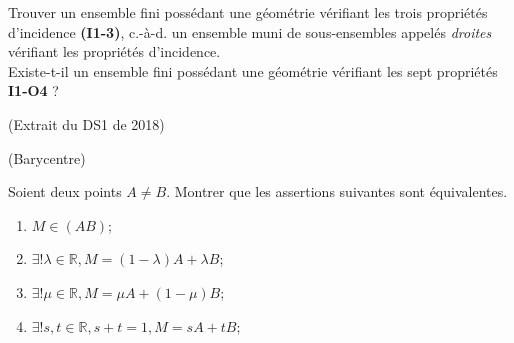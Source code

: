 \documentclass[a4paper,11pt,reqno]{amsart}
\begin{document}
\begin{exo}

  Trouver un ensemble fini possédant une géométrie vérifiant les trois propriétés d'incidence \textbf{(I1-3)}, c.-à-d. un ensemble muni de sous-ensembles appelés \emph{droites} vérifiant les propriétés d'incidence.\\
  Existe-t-il un ensemble fini possédant une géométrie vérifiant les sept propriétés \textbf{I1-O4} ?
\end{exo}

\begin{exo} (Extrait du DS1 de 2018)
\end{exo}

\begin{exo}[.7] (Barycentre)

  Soient deux points $A \neq B$. Montrer que les assertions suivantes sont équivalentes.\\[-1.7\baselineskip]
  \begin{multicols}{2}
    \begin{enumerate}
      \item $M \in (AB)$;
      \item $\exists! \lambda \in \mathbb{R}, M=(1-\lambda) A + \lambda B $;
      \item $\exists! \mu  \in \mathbb{R}, M=\mu A + (1-\mu) B $;
      \item $\exists! s,t  \in \mathbb{R}, s+t=1, M=s A + t B $;
    \end{enumerate}
  \end{multicols}
\end{exo}
\end{document}
